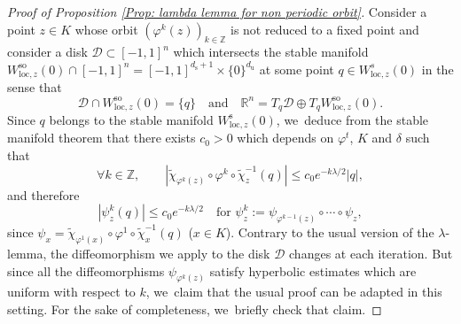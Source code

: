 \documentclass[11pt]{article}
\newcommand{\loc}{\mathrm{loc}}
\newcommand{\rs}{\mathrm{s}}
\newcommand{\rso}{\mathrm{so}}
\newcommand{\ru}{\mathrm{u}}
\theoremstyle{definition}
\theoremstyle{plain}
\newcommand{\D}{\mathcal{D}}
\newcommand{\R}{\mathbb{R}}
\newcommand{\Z}{\mathbb{Z}}
\begin{document}
\begin{appendix}
\begin{proof}[Proof of Proposition \ref{Prop: lambda lemma for non periodic orbit}]
Consider a point $z \in K$ whose orbit $(\varphi^k (z))_{k \in \Z}$ is not reduced to a fixed point and consider a disk $\D \subset [-1,1]^n$ which intersects the stable manifold $W_{\loc,z}^{\rso} (0) \cap [-1,1]^n =[-1,1]^{d_\rs +1} \times \{0\}^{d_\ru} $ at some point $q \in W_{\loc,z}^{s} (0)$ in the sense that
\[
\D \cap W_{\loc,z}^{\rso} (0) = \{q\} \quad \text{and} \quad \R^n = T_q \D \oplus T_q W_{\loc,z}^{\rso} (0).
\]
Since $q$ belongs to the stable manifold $ W_{\loc,z}^\rs (0)$, we~deduce from the stable manifold theorem that there exists $c_0 > 0$ which depends on $\varphi^t$, $K$ and $\delta$ such that
\[
\forall k \in \Z, \qquad | \widetilde{\chi}_{\varphi^k (z)} \circ \varphi^k \circ \widetilde{\chi}_{z}^{-1} (q)| \leq c_0 e^{- k\lambda /2} |q|,
\]
and therefore
\[
\left| \psi_z^k (q) \right| \leq c_0 e^{- k \lambda / 2} \quad \text{for } \psi_{z}^k:= \psi_{\varphi^{k-1}(z)} \circ \cdots \circ \psi_{z},
\]
since $\psi_x = \widetilde{\chi}_{\varphi^1 (x)} \circ \varphi^1 \circ \widetilde{\chi}_{x}^{-1} (q)$ ($x \in K$).
Contrary to the usual version of the $\lambda$-lemma, the diffeomorphism we apply to the disk $\D$ changes at each iteration. But since all the diffeomorphisms $\psi_{\varphi^k (z)}$ satisfy hyperbolic estimates which are uniform with respect to $k$, we~claim that the usual proof can be adapted in this setting. For the sake of completeness, we~briefly check that claim.


\end{proof}
\end{appendix}
\end{document}
